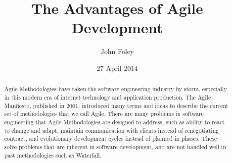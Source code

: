 \documentclass[11pt]{article}
\title{The Advantages of Agile Development}
\author{John Foley}
\date{27 April 2014}
\begin{document}
\maketitle

\thispagestyle{empty}

\begin{abstract}
  Agile Methodologies have taken the software engineering industry by storm, especially in this modern
  era of internet technology and application production. The Agile Manfiesto, published in 2001,
 introduced many terms and ideas to describe the current set of methodologies that we call Agile. There are many
 problems in software engineering that Agile Methodologies are designed to address, such as ability to react to 
 change and adapt, maintain communication with clients instead of renegotiating contract, and evolutionary development cycles
 instead of planned in phases. These solve problems that are inherent in software development, and are not handled well in past
 methodologies such as Waterfall. 
\end{abstract}

\pagebreak
\end{document}
